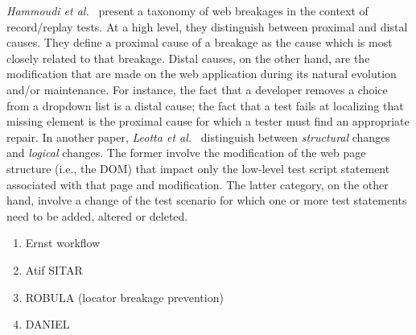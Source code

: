 \textit{Hammoudi et al.}~\cite{Hammoudi-2016-ICST} present a taxonomy of web breakages in the context of record/replay tests. At a high level, they distinguish between proximal and distal causes. They define a proximal cause of a breakage as the cause which is most closely related to that breakage. Distal causes, on the other hand, are the modification that are made on the web application during its natural evolution and/or maintenance. For instance, the fact that a developer removes a choice from a dropdown list is a distal cause; the fact that a test fails at localizing that missing element is the proximal cause for which a tester must find an appropriate repair. 
%
In another paper, \textit{Leotta et al.}~\cite{2016-leotta-Advances} distinguish between \textit{structural} changes and \textit{logical} changes. The former involve the modification of the web page structure (i.e., the DOM) that impact only the low-level test script statement associated with that page and modification. The latter category, on the other hand, involve a change of the test scenario for which one or more test statements need to be added, altered or deleted.





\begin{enumerate}
\item Ernst workflow
\item Atif SITAR
\item ROBULA (locator breakage prevention)
\item DANIEL
\end{enumerate}

